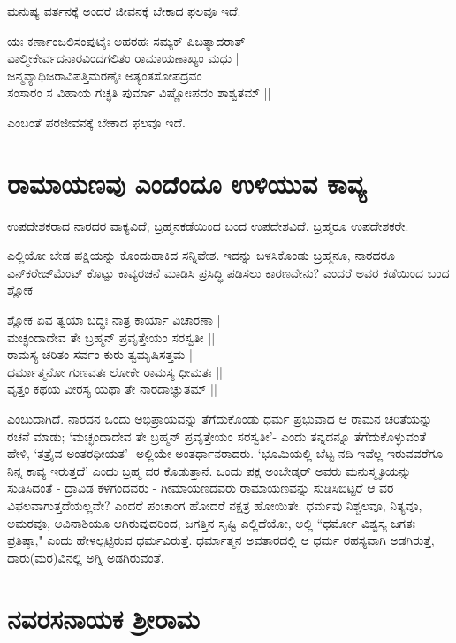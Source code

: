 ಮನುಷ್ಯ ವರ್ತನಕ್ಕೆ ಅಂದರೆ ಜೀವನಕ್ಕೆ ಬೇಕಾದ ಫಲವೂ ಇದೆ. 

\begin{shloka} 
ಯಃ ಕರ್ಣಾಂಜಲಿಸಂಪುಟೈಃ ಅಹರಹಃ ಸಮ್ಯಕ್‍ ಪಿಬತ್ಯಾದರಾತ್‍\\ 
ವಾಲ್ಮೀಕೇರ್ವದನಾರವಿಂದಗಲಿತಂ ರಾಮಾಯಣಾಖ್ಯಂ ಮಧು |\\ 
ಜನ್ಮವ್ಯಾಧಿಜರಾವಿಪತ್ತಿಮರಣೈಃ ಅತ್ಯಂತಸೋಪದ್ರವಂ\\ 
ಸಂಸಾರಂ ಸ ವಿಹಾಯ ಗಚ್ಛತಿ ಪುರ್ಮಾ ವಿಷ್ಣೋಃಪದಂ ಶಾಶ್ವತಮ್‍ ||
\end{shloka} 
ಎಂಬಂತೆ ಪರಜೀವನಕ್ಕೆ ಬೇಕಾದ ಫಲವೂ ಇದೆ. 

\section*{ರಾಮಾಯಣವು ಎಂದೆಂದೂ ಉಳಿಯುವ ಕಾವ್ಯ} 

ಉಪದೇಶಕರಾದ ನಾರದರ ವಾಕ್ಯವಿದೆ; ಬ್ರಹ್ಮನಕಡೆಯಿಂದ ಬಂದ ಉಪದೇಶವಿದೆ. ಬ್ರಹ್ಮರೂ ಉಪದೇಶಕರೇ. 

ಎಲ್ಲಿಯೋ ಬೇಡ ಪಕ್ಷಿಯನ್ನು ಕೊಂದುಹಾಕಿದ ಸನ್ನಿವೇಶ. ಇದನ್ನು ಬಳಸಿಕೊಂಡು ಬ್ರಹ್ಮನೂ, ನಾರದರೂ ಎನ್‍ಕರೇಜ್‍ಮೆಂಟ್‍ {} ಕೊಟ್ಟು ಕಾವ್ಯರಚನೆ ಮಾಡಿಸಿ ಪ್ರಸಿದ್ಧಿ ಪಡಿಸಲು ಕಾರಣವೇನು? ಎಂದರೆ ಅವರ ಕಡೆಯಿಂದ ಬಂದ ಶ್ಲೋಕ 

\begin{shloka}
ಶ್ಲೋಕ ಏವ ತ್ವಯಾ ಬದ್ಧಃ ನಾತ್ರ ಕಾರ್ಯಾ ವಿಚಾರಣಾ |\\ 
ಮಚ್ಛಂದಾದೇವ ತೇ ಬ್ರಹ್ಮನ್‍ ಪ್ರವೃತ್ತೇಯಂ ಸರಸ್ವತೀ ||\\ 
ರಾಮಸ್ಯ ಚರಿತಂ ಸರ್ವಂ ಕುರು ತ್ವಮೃಷಿಸತ್ತಮ |\\ 
ಧರ್ಮಾತ್ಮನೋ ಗುಣವತಃ ಲೋಕೇ ರಾಮಸ್ಯ ಧೀಮತಃ ||\\ 
ವೃತ್ತಂ ಕಥಯ ವೀರಸ್ಯ ಯಥಾ ತೇ ನಾರದಾಚ್ಘುತಮ್‍ ||
\end{shloka} 

ಎಂಬುದಾಗಿದೆ. ನಾರದನ ಒಂದು ಅಭಿಪ್ರಾಯವನ್ನು ತೆಗೆದುಕೊಂಡು ಧರ್ಮ ಪ್ರಭುವಾದ ಆ ರಾಮನ ಚರಿತೆಯನ್ನು ರಚನೆ ಮಾಡು; `ಮಚ್ಛಂದಾದೇವ ತೇ ಬ್ರಹ್ಮನ್‍ ಪ್ರವೃತ್ತೇಯಂ ಸರಸ್ವತೀ'- ಎಂದು ತನ್ನದನ್ನೂ ತೆಗೆದುಕೊಳ್ಳುವಂತೆ ಹೇಳಿ, `ತತ್ರೈವ ಅಂತರಧೀಯತ'-\label{181} ಅಲ್ಲಿಯೇ ಅಂತರ್ಧಾನರಾದರು. `ಭೂಮಿಯಲ್ಲಿ ಬೆಟ್ಟ-ನದಿ ಇವೆಲ್ಲ ಇರುವವರೆಗೂ ನಿನ್ನ ಕಾವ್ಯ ಇರುತ್ತದೆ' ಎಂದು ಬ್ರಹ್ಮ ವರ ಕೊಡುತ್ತಾನೆ. ಒಂದು ಪಕ್ಷ ಅಂಬೇಡ್ಕರ್‍ ಅವರು ಮನುಸ್ಮೃತಿಯನ್ನು ಸುಡಿಸಿದಂತೆ - ದ್ರಾವಿಡ ಕಳಗಂದವರು - ಗೀಮಾಯಣದವರು ರಾಮಾಯಣವನ್ನು ಸುಡಿಸಿಬಿಟ್ಟರೆ ಆ ವರ ವಿಫಲವಾಗುತ್ತದೆಯಲ್ಲವೇ? ಎಂದರೆ ಪಂಚಾಂಗ ಹೋದರೆ ನಕ್ಷತ್ರ ಹೋಯಿತೇ. ಧರ್ಮವು ನಿಶ್ಚಲವೂ, ನಿತ್ಯವೂ, ಅಮರವೂ, ಅವಿನಾಶಿಯೂ ಆಗಿರುವುದರಿಂದ, ಜಗತ್ತಿನ ಸೃಷ್ಟಿ ಎಲ್ಲಿದೆಯೋ, ಅಲ್ಲಿ ``ಧರ್ಮೋ ವಿಶ್ವಸ್ಯ ಜಗತಃ ಪ್ರತಿಷ್ಠಾ,"\label{182} ಎಂದು ಹೇಳಲ್ಪಟ್ಟಿರುವ ಧರ್ಮವಿರುತ್ತೆ. ಧರ್ಮಾತ್ಮನ ಅವತಾರದಲ್ಲಿ ಆ ಧರ್ಮ ರಹಸ್ಯವಾಗಿ ಅಡಗಿರುತ್ತೆ, ದಾರು(ಮರ)ವಿನಲ್ಲಿ ಅಗ್ನಿ ಅಡಗಿರುವಂತೆ. 

\section*{ನವರಸನಾಯಕ ಶ್ರೀರಾಮ} 

